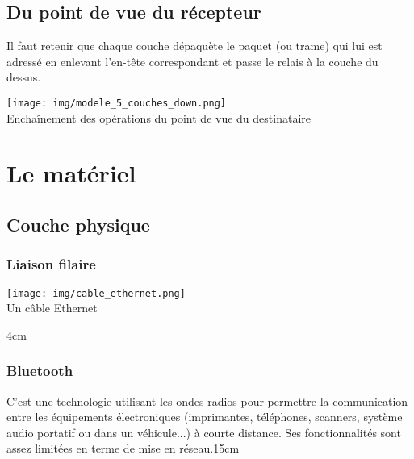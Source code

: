 \documentclass[a4paper,12pt]{book}
\begin{document}
\subsection*{Du point de vue du récepteur}

Il faut retenir que chaque couche dépaquète le paquet (ou trame) qui lui est adressé en enlevant l'en-tête correspondant et passe le relais à la couche du dessus.

\begin{center}
\texttt{[image: img/modele\_5\_couches\_down.png]}\\
\footnotesize{Enchaînement des opérations du point de vue du destinataire}
\end{center}
\section*{Le matériel}

\subsection*{Couche physique }

\subsubsection*{Liaison filaire}
{\begin{center}\texttt{[image: img/cable\_ethernet.png]}\footnotesize\\[1.7em] Un câble Ethernet\end{center}}{4cm}


\subsubsection*{Bluetooth}
{C'est une technologie utilisant les ondes radios pour permettre la communication entre les équipements électroniques (imprimantes, téléphones, scanners, système audio portatif ou dans un véhicule...) à courte distance. Ses fonctionnalités sont assez limitées en terme de mise en réseau.}{15cm}
\end{document}
